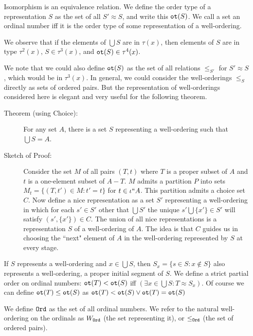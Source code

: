 \documentclass[12pt]{article}
\begin{document}
Isomorphism is an equivalence relation.  We define the order type of a representation $S$ as the set of all $S' \approx S$, and write this ${\tt ot}(S)$.  We call a set an ordinal number iff it is the order type of some representation of a well-ordering.  

We observe that if the elements of $\bigcup S$ are in $\tau(x)$, then elements of $S$ are in type $\tau^2(x)$, $S \in \tau^3(x)$, and ${\tt ot}(S) \in \tau^4(x)$.

We note that we could also define ${\tt ot}(S)$ as the set of all relations $\leq_{S'}$ for $S' \approx S$, which would be in $\tau^3(x)$.  In general, we could consider the
well-orderings $\leq_S$ directly as sets of ordered pairs.  But the representation of well-orderings considered here is elegant and very useful for the following theorem.

\begin{description}

\item[Theorem (using Choice):]  For any set $A$, there is a set $S$ representing a well-ordering such that $\bigcup S=A$.

\item[Sketch of Proof:]  Consider the set $M$ of all pairs $(T,t)$ where $T$ is a proper subset of $A$ and $t$ is a one-element subset of $A-T$.  $M$ admits a partition $P$ into sets $M_t = \{(T,t') \in M:t' = t\}$ for $t \in \iota``A$.  This partition admits a choice set $C$.  Now define a nice representation
as a set $S'$ representing a well-ordering in which for each $s' \in S'$ other that $\bigcup S'$ the unique $s' \bigcup \{x'\} \in S'$ will satisfy $(s',\{x'\}) \in C$.  The union of all nice representations is a representation $S$ of a well-ordering of $A$.  The idea is that $C$ guides us in choosing the ``next" element of $A$ in the well-ordering represented by $S$ at every stage.

\end{description}

If $S$ represents a well-ordering and $x \in \bigcup S$, then $S_x = \{s \in S:x \not\in S\}$ also represents a well-ordering, a proper initial segment of $S$.  We define
a strict partial order on ordinal numbers:  ${\tt ot}(T) < {\tt ot}(S)$ iff $(\exists x \in \bigcup S:T \approx S_x)$.  Of course we can define ${\tt ot}(T) \leq {\tt ot}(S)$ as
${\tt ot}(T) <  {\tt ot}(S) \vee {\tt ot}(T) = {\tt ot}(S)$

We define ${\tt Ord}$ as the set of all ordinal numbers.  We refer to the natural well-ordering on the ordinals as $W_{\tt Ord}$ (the set representing it), or $\leq_{\tt Ord}$ (the set of ordered pairs).
\end{document}
